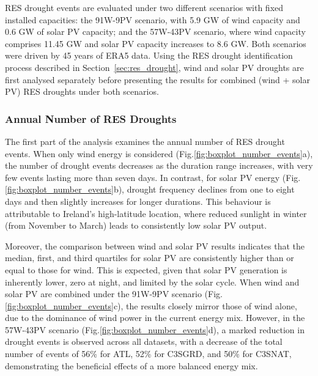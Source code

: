 \documentclass[preprint, 12pt]{elsarticle}
\providecommand{\DIFadd}[1]{{\protect\color{blue}\uwave{#1}}} %
\providecommand{\DIFaddbegin}{} %
\providecommand{\DIFaddend}{} %
\begin{document}
RES drought events are evaluated under two different scenarios with fixed installed capacities: the 91W-9PV scenario, with 5.9 GW of wind capacity and 0.6 GW of solar PV capacity; and the 57W-43PV scenario, where wind capacity comprises 11.45 GW and solar PV capacity increases to 8.6 GW. Both scenarios were driven by 45 years of ERA5 data. Using the RES drought identification process described in Section~\ref{sec:res_drought}, wind and solar PV droughts are first analysed separately before presenting the results for combined (wind + solar PV) RES droughts under both scenarios.

\subsubsection{Annual Number of RES Droughts}

The first part of the analysis examines the annual number of RES drought events. When only wind energy is considered (Fig.\DIFaddbegin \DIFadd{~}\DIFaddend \ref{fig:boxplot_number_events}a), the number of \DIFaddbegin \DIFadd{RES }\DIFaddend drought events decreases as the duration range increases, with very few events lasting more than seven days. In contrast, for solar PV energy (Fig.\DIFaddbegin \DIFadd{~}\DIFaddend \ref{fig:boxplot_number_events}b), \DIFaddbegin \DIFadd{RES }\DIFaddend drought frequency declines from one to eight days and then slightly increases for longer durations. This behaviour is attributable to Ireland's high-latitude location, where reduced sunlight in winter (from November to March) leads to consistently low solar PV output.

Moreover, the comparison between wind and solar PV results indicates that the median, first, and third quartiles for solar PV are consistently higher than or equal to those for wind. This is expected, given that solar PV generation is inherently lower, zero at night, and limited by the solar cycle. When wind and solar PV are combined under the 91W-9PV scenario (Fig.\DIFaddbegin \DIFadd{~}\DIFaddend \ref{fig:boxplot_number_events}c), the results closely mirror those of wind alone, due to the dominance of wind power in the current energy mix. However, in the 57W-43PV scenario (Fig.\DIFaddbegin \DIFadd{~}\DIFaddend \ref{fig:boxplot_number_events}d), a marked reduction in \DIFaddbegin \DIFadd{RES }\DIFaddend drought events is observed across all datasets, with a decrease of the total number of events of 56\% for ATL, 52\% for C3S\DIFaddbegin \DIFadd{~}\DIFaddend GRD, and 50\% for C3S\DIFaddbegin \DIFadd{~}\DIFaddend NAT, demonstrating the beneficial effects of a more balanced energy mix.
\end{document}
